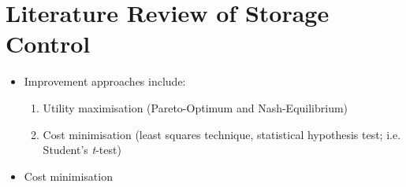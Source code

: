 \chapter{Literature Review of Storage Control}
\label{ch-review}



\begin{itemize}
	\item Improvement approaches include:
	\begin{enumerate}
		\item Utility maximisation (Pareto-Optimum and Nash-Equilibrium)
		\item Cost minimisation (least squares technique, statistical hypothesis test; i.e. Student's \textit{t}-test)
	\end{enumerate}
	\item Cost minimisation 
\end{itemize}








